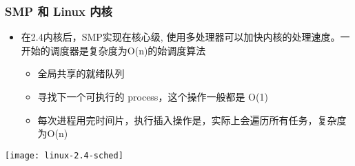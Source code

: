 \begin{frame}
	\frametitle{SMP 和 Linux 内核}

	\begin{itemize}
	
	\item 在2.4内核后，SMP实现在核心级, 使用多处理器可以加快内核的处理速度。一开始的调度器是复杂度为O(n)的始调度算法
	
		\begin{itemize}
		\item 全局共享的就绪队列
		\item 寻找下一个可执行的 process，这个操作一般都是 O(1)
		\item 每次进程用完时间片，执行插入操作是，实际上会遍历所有任务，复杂度为O(n)

		\end{itemize}
	\end{itemize}
	
	\texttt{[image: linux-2.4-sched]}


\end{frame}

